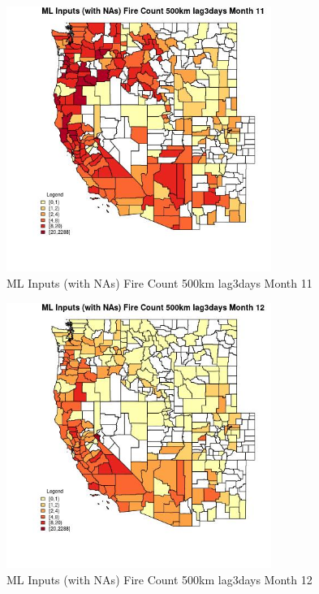 \clearpage 

\begin{figure} 
\centering  
\includegraphics[width=0.77\textwidth]{Code_Outputs/Report_ML_input_PM25_Step4_part_e_de_duplicated_aves_compiled_2019-05-20wNAs_CountyFire_Count_500km_lag3daysmedianMonth11.jpg} 
\caption{\label{fig:Report_ML_input_PM25_Step4_part_e_de_duplicated_aves_compiled_2019-05-20wNAsCountyFire_Count_500km_lag3daysmedianMonth11}ML Inputs (with NAs) Fire Count 500km lag3days Month 11} 
\end{figure} 
 

\begin{figure} 
\centering  
\includegraphics[width=0.77\textwidth]{Code_Outputs/Report_ML_input_PM25_Step4_part_e_de_duplicated_aves_compiled_2019-05-20wNAs_CountyFire_Count_500km_lag3daysmedianMonth12.jpg} 
\caption{\label{fig:Report_ML_input_PM25_Step4_part_e_de_duplicated_aves_compiled_2019-05-20wNAsCountyFire_Count_500km_lag3daysmedianMonth12}ML Inputs (with NAs) Fire Count 500km lag3days Month 12} 
\end{figure} 
 

